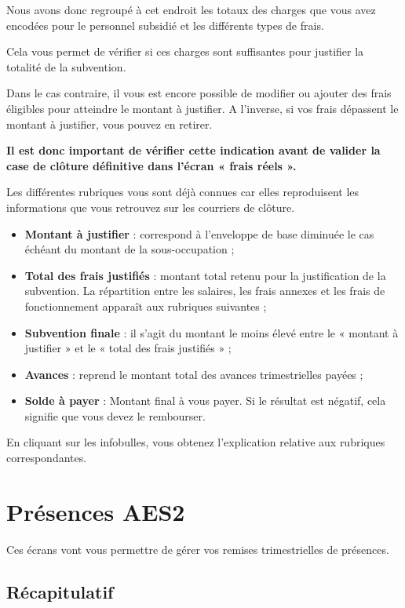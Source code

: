 Nous avons donc regroupé à cet endroit les totaux des charges que vous avez encodées pour le personnel subsidié et les différents types de frais. 

Cela vous permet de vérifier si ces charges sont suffisantes pour justifier la totalité de la subvention. 

\begin{attention}\normalfont
Dans le cas contraire, il vous est encore possible de modifier ou ajouter des frais éligibles pour atteindre le montant à justifier. A l’inverse, si vos frais dépassent le montant à justifier, vous pouvez en retirer.

\textcolor{rouge}{\textbf{Il est donc important de vérifier cette indication avant de valider la case de clôture définitive dans l’écran « frais réels ». }}
\end{attention}


Les différentes rubriques vous sont déjà connues car elles reproduisent les informations que vous retrouvez sur les courriers de clôture.
\begin{itemize}
    \item \textbf{Montant à justifier} : correspond à l’enveloppe de base diminuée le cas échéant du montant de la sous-occupation ;
    \item \textbf{Total des frais justifiés} : montant total retenu pour la justification de la subvention. La répartition entre les salaires, les frais annexes et les frais de fonctionnement apparaît aux rubriques suivantes ;
    \item \textbf{Subvention finale} : il s’agit du montant le moins élevé entre le « montant à justifier » et le « total des frais justifiés » ;
    \item \textbf{Avances} : reprend le montant total des avances trimestrielles payées ;
    \item \textbf{Solde à payer} : Montant final à vous payer. Si le résultat est négatif, cela signifie que vous devez le rembourser. 
\end{itemize}

En cliquant sur les infobulles, vous obtenez l’explication relative aux rubriques correspondantes.

\section{Présences AES2}
Ces écrans vont vous permettre de gérer vos remises trimestrielles de présences.
\subsection{Récapitulatif} \label{aes2_récapitulatif}

